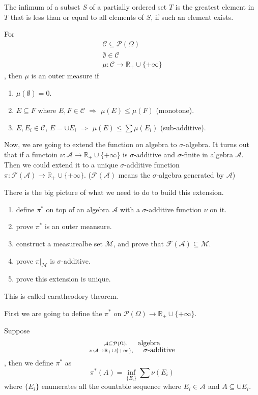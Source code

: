 \begin{define}[infimum]
  \label{define:infimum}
  The infimum of a subset $S$ of a partially ordered set $T$ is the greatest element in $T$ that is less than or equal to all elements of $S$, if such an element exists.
\end{define}

\begin{define}
  For \[\substack{
    \mathcal{C}\subseteq\mathcal{P}(\Omega) \\
    \emptyset \in \mathcal{C} \\
    \mu : \mathcal{C} \to \mathbb{R}_+\cup\{+\infty\}
  }\], then $\mu$ is an outer measure if
  \begin{enumerate}
  \item $\mu(\emptyset) = 0$.
  \item $E\subseteq F$ where $E, F\in \mathcal{C}$ $\Rightarrow$ $\mu(E)\leq\mu(F)$ (monotone).
  \item $E, E_i\in\mathcal{C}$, $E = \cup E_i$ $\Rightarrow$ $\mu(E) \leq \sum\mu(E_i)$ (sub-additive).
  \end{enumerate}
\end{define}

Now, we are going to extend the function on algebra to $\sigma$-algebra.
It turns out that if a functoin $\nu : \mathcal{A} \to \mathbb{R}_+\cup\{+\infty\}$ is $\sigma$-additive and $\sigma$-finite in algebra $\mathcal{A}$.
Then we could extend it to a unique $\sigma$-additive function $\pi : \mathcal{F}(\mathcal{A}) \to \mathbb{R}_+\cup\{+\infty\}$.
($\mathcal{F}(\mathcal{A})$ means the $\sigma$-algebra generated by $\mathcal{A}$)

There is the big picture of what we need to do to build this extension.
\begin{enumerate}
\item define $\pi^*$ on top of an algebra $\mathcal{A}$ with a $\sigma$-additive function $\nu$ on it.
\item prove $\pi^*$ is an outer meansure.
\item construct a measurealbe set $\mathcal{M}$, and prove that $\mathcal{F}(\mathcal{A})\subseteq \mathcal{M}$.
\item prove $\pi|_{\mathcal{M}}$ is $\sigma$-additive.
\item prove this extension is unique.
\end{enumerate}
This is called caratheodory theorem.

First we are going to define the $\pi^*$ on $\mathcal{P}(\Omega) \to \mathbb{R}_+\cup\{+\infty\}$.
\begin{define}
  Suppose \[\substack{
    \mathcal{A}\subseteq\mathcal{P}(\Omega),\hspace{0.5cm} \mbox{algebra} \\
    \nu : \mathcal{A} \to \mathbb{R}_+\cup\{+\infty\}, \hspace{0.5cm} \mbox{$\sigma$-additive} 
  }\]
  , then we define $\pi^*$ as
  \[\pi^*(A) = \inf_{\{E_i\}} \sum\nu(E_i)\]
  where $\{E_i\}$ enumerates all the countable sequence where
  $E_i\in\mathcal{A}$ and $A\subseteq\cup E_i$.
\end{define}

